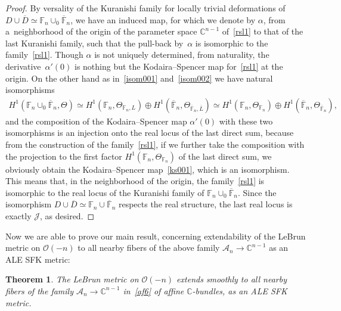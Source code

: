 \documentclass[11pt]{article}
\numberwithin{equation}{section}
\newtheorem{Theorem}{Theorem}[section]
\begin{document}
\begin{proof}
By versality of the Kuranishi family for locally trivial deformations of $D\cup\overline D\simeq\mathbb{F}_n\cup_0
\overline{\mathbb{F}}_n$, we have an induced map, for which we denote by $\alpha$, from a~neighborhood of the origin of
the parameter space $\mathbb{C}^{n-1}$ of~\eqref{rsl1} to that of the last Kuranishi family, such that the pull-back by~$\alpha$ is isomorphic to the family~\eqref{rsl1}.
Though $\alpha$ is not uniquely determined, from naturality, the derivative~$\alpha'(0)$ is nothing but the
Kodaira--Spencer map for~\eqref{rsl1} at the origin.
On the other hand as in~\eqref{isom001} and~\eqref{isom002} we have natural isomorphisms
\begin{gather*}
H^1(\mathbb{F}_n \cup_0 \overline{\mathbb{F}}_n,\Theta) \simeq H^1(\mathbb{F}_n, \Theta_{\mathbb{F}_n,L}) \oplus H^1
(\overline{\mathbb{F}}_n,\Theta_{\overline{\mathbb{F}}_n,\overline L}) \simeq H^1(\mathbb{F}_n, \Theta_{\mathbb{F}_n})
\oplus H^1 (\overline{\mathbb{F}}_n,\Theta_{\overline{\mathbb{F}}_n}),
\end{gather*}
and the composition of the Kodaira--Spencer map $\alpha'(0)$ with these two isomorphisms is an injection onto the real
locus of the last direct sum, because from the construction of the family~\eqref{rsl1}, if we further take the
composition with the projection to the f\/irst factor $H^1(\mathbb{F}_n, \Theta_{\mathbb{F}_n})$ of the last direct sum,
we obviously obtain the Kodaira--Spencer map~\eqref{ks001}, which is an isomorphism.
This means that, in the neighborhood of the origin, the family~\eqref{rsl1} is isomorphic to the real locus of the
Kuranishi family of $\mathbb{F}_n\cup_0\overline{\mathbb{F}}_n$.
Since the isomorphism $D\cup\overline D \simeq \mathbb{F}_n\cup\overline{\mathbb{F}}_n$ respects the real structure, the
last real locus is exactly $\mathscr J$, as desired.
\end{proof}

Now we are able to prove our main result, concerning extendability of the LeBrun metric on $\mathscr O(-n)$ to all
nearby f\/ibers of the above family $\mathscr A_n\to \mathbb{C}^{n-1}$ as an ALE SFK metric:

\begin{Theorem}
\label{thm:main01}
The LeBrun metric on $\mathscr O(-n)$ extends smoothly to all nearby fibers of the family $\mathscr
A_n\to\mathbb{C}^{n-1}$ in~\eqref{af6} of affine $\mathbb{C}$-bundles, as an ALE SFK metric.
\end{Theorem}
\end{document}

